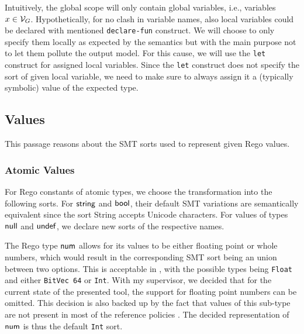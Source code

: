 Intuitively, the global scope will only contain global variables, i.e., variables $x \in \mathcal{V}_G$.
Hypothetically, for no clash in variable names, also local variables could be declared with mentioned \texttt{declare-fun} construct.
We will choose to only specify them locally as expected by the \rego semantics but with the main purpose not to let them pollute the output model.
For this cause, we will use the \texttt{let} construct for assigned local variables.
Since the \texttt{let} construct does not specify the sort of given local variable, we need to make sure to always assign it a (typically symbolic) value of the expected type.

\subsection{Values}
\label{trans:ss:vals}

This passage reasons about the SMT sorts used to represent given Rego values.

\subsubsection{Atomic Values}

For Rego constants of atomic types, we choose the transformation into the following \smtlib sorts.
For $\mathsf{string}$ and $\mathsf{bool}$, their default SMT variations are semantically equivalent since the sort String accepts Unicode characters.
For values of types $\mathsf{null}$ and $\mathsf{undef}$, we declare new sorts of the respective names.

The Rego type $\mathsf{num}$ allows for its values to be either floating point or whole numbers, which would result in the corresponding SMT sort being an union between two options.
This is acceptable in \smtlib, with the possible types being \texttt{Float} and either \texttt{BitVec 64} or \texttt{Int}.
With my supervisor, we decided that for the current state of the presented tool, the support for floating point numbers can be omitted.
This decision is also backed up by the fact that values of this sub-type are not present in most of the reference policies \cite{rego-policies:web}.
The decided representation of $\mathsf{num}$ is thus the default \texttt{Int} sort.

